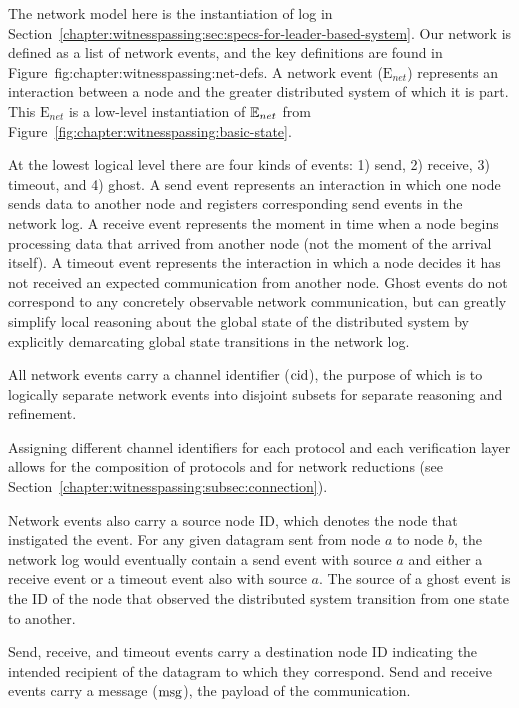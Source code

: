 The network model here is the instantiation of log in
 Section~\ref{chapter:witnesspassing:sec:specs-for-leader-based-system}. Our network is defined as a list of
network events, and the key definitions are found in Figure~{fig:chapter:witnesspassing:net-defs}. A
network event ($\mathrm{E}_{net}$) represents an interaction between a node and
the greater distributed system of which it is part. This $\mathrm{E}_{net}$ is a
low-level instantiation of ${\mathbb{E}_{net}}$ from Figure~\ref{fig:chapter:witnesspassing:basic-state}.

At the lowest logical level there are four kinds of events: 1) send, 2) receive,
3) timeout, and 4) ghost. A send event represents an interaction in which one
node sends data to another node and registers corresponding send events in the
network log. A receive event represents the moment in time when a node begins
processing data that arrived from another node (not the moment of the arrival
itself). A timeout event represents the interaction in which a node decides it
has not received an expected communication from another node. Ghost events do
not correspond to any concretely observable network communication, but can
greatly simplify local reasoning about the global state of the distributed
system by explicitly demarcating global state transitions in the network log.

All network events carry a channel identifier ($\mathrm{cid}$), the purpose of which is
to logically separate network events into disjoint subsets for separate
reasoning and refinement.  Assigning different channel identifiers for each
protocol and each verification layer allows for the composition of protocols and
for network reductions (see Section~\ref{chapter:witnesspassing:subsec:connection}).

Network events also carry a source node ID, which denotes the node that
instigated the event. For any given datagram sent from node $a$ to node $b$, the
network log would eventually contain a send event with source $a$ and either a
receive event or a timeout event also with source $a$. The source of a ghost
event is the ID of the node that observed the distributed system transition from
one state to another.  Send, receive, and timeout events carry a
destination node ID indicating the intended recipient of the datagram to which
they correspond. Send and receive events carry a message ($\mathrm{msg}$), the payload
of the communication.

